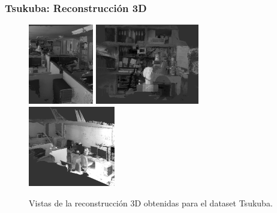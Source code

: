 \documentclass[compress]{beamer}
\begin{document}
\begin{frame}
	\frametitle{Tsukuba: Reconstrucción 3D}
\begin{figure}[!htb]
	\centering
	{\includegraphics[width=0.32\columnwidth, height=3.5cm]{./images/tsukuba_3d_1}%
		\label{tsukuba_3d_1}}
	\hfil
	{\includegraphics[width=0.32\columnwidth, height=3.5cm]{./images/tsukuba_3d_2}%
		\label{tsukuba_3d_2}}
	\hfil
	{\includegraphics[width=0.32\columnwidth, height=3.5cm]{./images/tsukuba_3d_3}%
		\label{tsukuba_3d_3}}
	
	\caption{Vistas de la reconstrucción 3D obtenidas para el dataset Tsukuba.}
	\label{fig:tsukuba_reconstructions}
\end{figure}
\end{frame}
\end{document}

